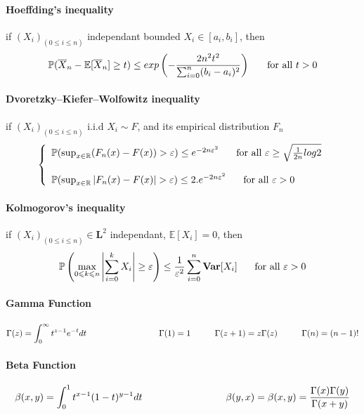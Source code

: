 \documentclass[a4paper,10pt]{article}
\begin{document}
\paragraph{Hoeffding's inequality}
if $(X_{i})_{(0\leqslant i \leqslant n)}$ independant bounded $X_i \in [a_i,b_i]$, then
\[
\mathbb{P}(\overline{X}_n- \mathbb{E}[\overline{X}_n] \geq t) \leq exp\left(-\frac{2n^2t^2}{\sum_{i=0}^{n} (b_i-a_i)^2}\right) 
\hspace{5mm} \text{ for all } t >0
\]

\paragraph{Dvoretzky–Kiefer–Wolfowitz inequality}
if $(X_{i})_{(0\leqslant i \leqslant n)}$ i.i.d  $X_i \sim F $, and its empirical distribution $F_n$ 
\[
\left\{
\begin{array}{l}
\mathbb{P}( \sup_{x\in \mathbb{R}} ( {F}_n(x)- F(x) ) > \varepsilon ) \leq e^{-2n\varepsilon^2} 
\hspace{5mm} \text{ for all } \varepsilon \geq \sqrt{\frac{1}{2n}log2} \\ \\
\mathbb{P}( \sup_{x\in \mathbb{R}} | {F}_n(x)- F(x) | > \varepsilon ) \leq 2.e^{-2n\varepsilon^2} 
\hspace{5mm} \text{ for all } \varepsilon > 0
\end{array}
\right.
\]


\paragraph{Kolmogorov's inequality}
if $(X_{i})_{(0\leqslant i \leqslant n)} \in \textbf{L}^2$ independant, $\mathbb{E}[X_i]=0$, then
\[
\mathbb{P}\left( \max_{0\leqslant k \leqslant n}\left| \sum_{i=0}^{k} X_i  \right| 
\geq \varepsilon \right) \leq \frac{1}{\varepsilon^2} \sum_{i=0}^{n} \textbf{Var}[X_i]
\hspace{5mm} \text{ for all } \varepsilon >0
\]

\paragraph{Gamma Function}
\[
\Gamma(z) = \int_{0}^{\infty} t^{z-1}e^{-t}dt 
\hspace{30mm}  \Gamma(1) = 1 
\hspace{10mm}  \Gamma(z+1) = z\Gamma(z) 
\hspace{10mm}  \Gamma(n) = (n-1)! 
\]
\paragraph{Beta Function}
\[
\beta(x,y)=  \int_{0}^{1}  t^{x-1}(1-t)^{y-1}dt  \hspace{30mm} \beta(y,x)=\beta(x,y)= \frac{\Gamma(x)\Gamma(y)}{\Gamma(x+y)}
\]
\end{document}
